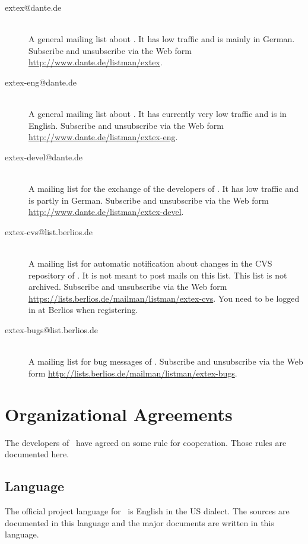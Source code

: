 \begin{description}
\item[extex@dante.de] \ \\
  A general mailing list about \ExTeX. It has low traffic and is
  mainly in German. Subscribe and unsubscribe via the Web form
  \url{http://www.dante.de/listman/extex}.

\item[extex-eng@dante.de] \ \\
  A general mailing list about \ExTeX. It has currently very low
  traffic and is in English. Subscribe and unsubscribe via the Web
  form \url{http://www.dante.de/listman/extex-eng}.

\item[extex-devel@dante.de] \ \\
  A mailing list for the exchange of the developers of \ExTeX. It has
  low traffic and is partly in German. Subscribe and unsubscribe via
  the Web form \url{http://www.dante.de/listman/extex-devel}.

\item[extex-cvs@list.berlios.de] \ \\
  A mailing list for automatic notification about changes in the CVS
  repository of \ExTeX. It is not meant to post mails on this list.
  This list is not archived. Subscribe and unsubscribe via the Web
  form \url{https://lists.berlios.de/mailman/listman/extex-cvs}. You
  need to be logged in at Berlios when registering.

\item[extex-bugs@list.berlios.de] \ \\
  A mailing list for bug messages of \ExTeX. Subscribe and unsubscribe
  via the Web form
  \url{http://lists.berlios.de/mailman/listman/extex-bugs}.
\end{description}


\section{Organizational Agreements}

The developers of \ExTeX\ have agreed on some rule for cooperation.
Those rules are documented here.

\subsection{Language}

The official project language for \ExTeX\ is English in the US
dialect. The sources are documented in this language and the major
documents are written in this language.

